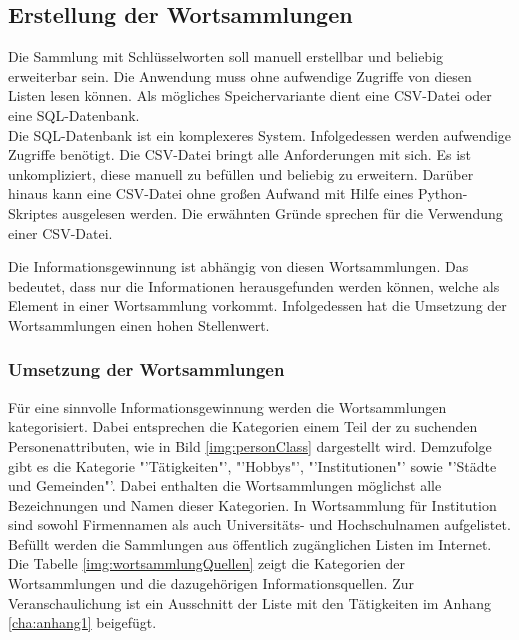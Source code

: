 	\subsection{Erstellung der Wortsammlungen}
	Die Sammlung mit Schlüsselworten soll manuell erstellbar und beliebig erweiterbar sein. Die Anwendung muss ohne aufwendige Zugriffe von diesen Listen lesen können. Als mögliches Speichervariante dient eine CSV-Datei oder eine SQL-Datenbank.\\
	Die SQL-Datenbank ist ein komplexeres System. Infolgedessen werden aufwendige Zugriffe benötigt. Die CSV-Datei bringt alle Anforderungen mit sich. Es ist unkompliziert, diese manuell zu befüllen und beliebig zu erweitern. Darüber hinaus kann eine CSV-Datei ohne großen Aufwand mit Hilfe eines Python-Skriptes ausgelesen werden. Die erwähnten Gründe sprechen für die Verwendung einer CSV-Datei.
	
	Die Informationsgewinnung ist abhängig von diesen Wortsammlungen. Das bedeutet, dass nur die Informationen herausgefunden werden können, welche als Element in einer Wortsammlung vorkommt. Infolgedessen hat die Umsetzung der Wortsammlungen einen hohen Stellenwert.
	
		
		\subsubsection{Umsetzung der Wortsammlungen}	
		Für eine sinnvolle Informationsgewinnung werden die Wortsammlungen kategorisiert. Dabei entsprechen die Kategorien einem Teil der zu suchenden Personenattributen, wie in Bild \ref{img:personClass} dargestellt wird. Demzufolge gibt es die Kategorie "'Tätigkeiten"', "'Hobbys"', "'Institutionen"' sowie "'Städte und Gemeinden"'. Dabei enthalten die Wortsammlungen möglichst alle Bezeichnungen und Namen dieser Kategorien. 
		In Wortsammlung für Institution sind sowohl Firmennamen als auch Universitäts- und Hochschulnamen aufgelistet. Befüllt werden die Sammlungen aus öffentlich zugänglichen Listen im Internet. Die Tabelle \ref{img:wortsammlungQuellen} zeigt die Kategorien der Wortsammlungen und die dazugehörigen Informationsquellen. Zur Veranschaulichung ist ein Ausschnitt der Liste mit den Tätigkeiten im Anhang \ref{cha:anhang1} beigefügt. \\
		
